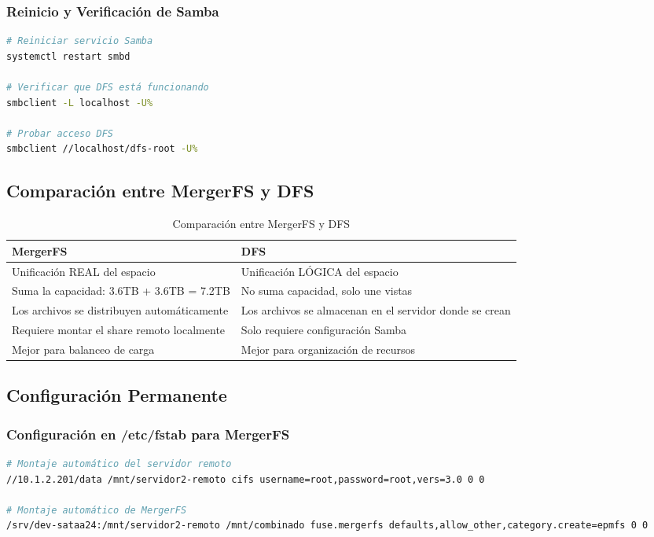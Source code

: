 \documentclass[12pt, a4paper]{article}
\begin{document}
\subsubsection{Reinicio y Verificación de Samba}
\begin{lstlisting}[language=bash, caption=Reinicio y prueba de DFS]
# Reiniciar servicio Samba
systemctl restart smbd

# Verificar que DFS está funcionando
smbclient -L localhost -U%

# Probar acceso DFS
smbclient //localhost/dfs-root -U%
\end{lstlisting}

\subsection{Comparación entre MergerFS y DFS}
\label{subsec:comparacion_mergerfs_dfs}

\begin{table}[H]
\centering
\caption{Comparación entre MergerFS y DFS}
\begin{tabular}{|p{}|p{}|}
\hline
\textbf{MergerFS} & \textbf{DFS} \\
\hline
Unificación REAL del espacio & Unificación LÓGICA del espacio \\
\hline
Suma la capacidad: 3.6TB + 3.6TB = 7.2TB & No suma capacidad, solo une vistas \\
\hline
Los archivos se distribuyen automáticamente & Los archivos se almacenan en el servidor donde se crean \\
\hline
Requiere montar el share remoto localmente & Solo requiere configuración Samba \\
\hline
Mejor para balanceo de carga & Mejor para organización de recursos \\
\hline
\end{tabular}
\end{table}

\subsection{Configuración Permanente}
\label{subsec:configuracion_permanente}

\subsubsection{Configuración en /etc/fstab para MergerFS}
\begin{lstlisting}[language=bash, caption=Configuración permanente en fstab]
# Montaje automático del servidor remoto
//10.1.2.201/data /mnt/servidor2-remoto cifs username=root,password=root,vers=3.0 0 0

# Montaje automático de MergerFS
/srv/dev-sataa24:/mnt/servidor2-remoto /mnt/combinado fuse.mergerfs defaults,allow_other,category.create=epmfs 0 0
\end{lstlisting}
\end{document}
